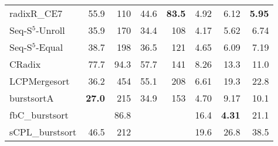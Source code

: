 \documentclass[a4paper]{myjournal}
\begin{document}
\begin{table}[p]
\begin{tabular}{l|rrrr rrr|}
     radixR\_CE7 &     55.9 &      110 &     44.6 & \bf 83.5 &     4.92 &     6.12 & \bf 5.95 \\
Seq-S$^5$-Unroll &     35.9 &      170 &     34.4 &      108 &     4.17 &     5.62 &     6.74 \\
 Seq-S$^5$-Equal &     38.7 &      198 &     36.5 &      121 &     4.65 &     6.09 &     7.19 \\
          CRadix &     77.7 &     94.3 &     57.7 &      141 &     8.26 &     13.3 &     11.0 \\
    LCPMergesort &     36.2 &      454 &     55.1 &      208 &     6.61 &     19.3 &     22.8 \\
      burstsortA & \bf 27.0 &      215 &     34.9 &      153 &     4.70 &     9.17 &     10.1 \\
  fbC\_burstsort &          &     86.8 &          &          &     16.4 & \bf 4.31 &     21.1 \\
 sCPL\_burstsort &     46.5 &      212 &          &          &     19.6 &     26.8 &     38.5 \\ \hline
\end{tabular}
\end{table}
 


\def\SpeedupLegend{\legend{
    pS$^5$-Unroll,
    pS$^5$-Equal,
    pS$^5$-Unroll + pLCP-Merge,
    pMultikeyQuicksort,
    pRadixsort 8-bit,
    pRadixsort 16-bit,
    pRadixsort Akiba
  }}
\end{document}
